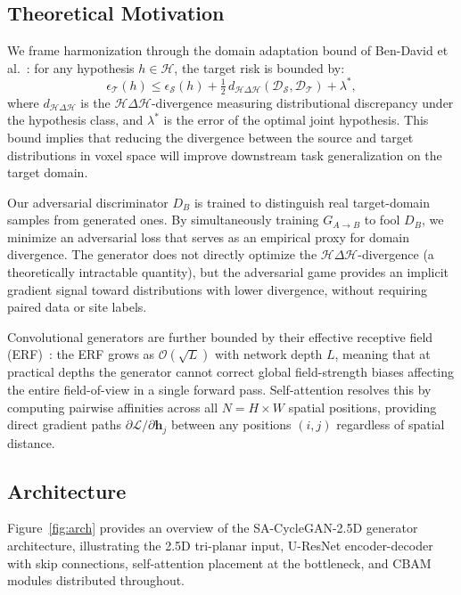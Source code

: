 \documentclass{article}
\begin{document}
\subsection{Theoretical Motivation}
\label{sec:theory}

We frame harmonization through the domain adaptation bound of Ben-David et
al.~\cite{ben2010theory}: for any hypothesis $h \in \mathcal{H}$, the target risk is
bounded by:
\begin{equation}
  \epsilon_\mathcal{T}(h) \leq \epsilon_\mathcal{S}(h)
    + \tfrac{1}{2}\, d_{\mathcal{H}\Delta\mathcal{H}}(\mathcal{D}_\mathcal{S}, \mathcal{D}_\mathcal{T})
    + \lambda^*,
  \label{eq:da_bound}
\end{equation}
where $d_{\mathcal{H}\Delta\mathcal{H}}$ is the $\mathcal{H}\Delta\mathcal{H}$-divergence
measuring distributional discrepancy under the hypothesis class, and $\lambda^*$ is the
error of the optimal joint hypothesis. This bound implies that reducing the divergence
between the source and target distributions in voxel space will improve downstream task
generalization on the target domain.

Our adversarial discriminator $D_B$ is trained to distinguish real target-domain samples
from generated ones. By simultaneously training $G_{A\to B}$ to fool $D_B$, we minimize
an adversarial loss that serves as an empirical proxy for domain divergence. The generator
does not directly optimize the $\mathcal{H}\Delta\mathcal{H}$-divergence (a theoretically
intractable quantity), but the adversarial game provides an implicit gradient signal
toward distributions with lower divergence, without requiring paired data or site labels.

Convolutional generators are further bounded by their effective receptive field
(ERF)~\cite{luo2016erf}: the ERF grows as $\mathcal{O}(\sqrt{L})$ with network depth $L$,
meaning that at practical depths the generator cannot correct global field-strength biases
affecting the entire field-of-view in a single forward pass. Self-attention
resolves this by computing pairwise affinities across all $N = H \times W$ spatial
positions, providing direct gradient paths $\partial\mathcal{L}/\partial \mathbf{h}_j$
between any positions $(i,j)$ regardless of spatial distance.

\subsection{Architecture}
\label{sec:arch}

Figure~\ref{fig:arch} provides an overview of the SA-CycleGAN-2.5D generator
architecture, illustrating the 2.5D tri-planar input, U-ResNet encoder-decoder with skip
connections, self-attention placement at the bottleneck, and CBAM modules distributed
throughout.
\end{document}

